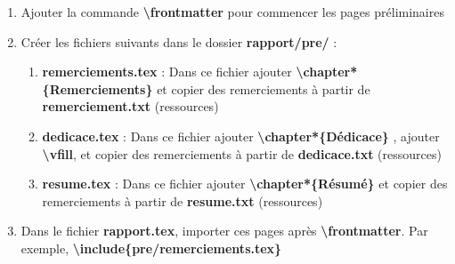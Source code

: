 \documentclass[11pt, a4paper]{article}
\begin{document}
\begin{enumerate}
\begin{multicols}{2}
\begin{itemize}
\begin{itemize}
				\item le titre doit être en gras, taille \textbf{Huge}, centré.
			\end{itemize}
			\item Ajouter \textbf{\textbackslash vspace\{2cm\}} pour pousser le contenu qui vient après avec 2cm
			\item Insérer un tableau sans bordures avec deux lignes et trois colonnes alignées à gauche :
			\begin{itemize}
				\item la première ligne "Encadré par :" en gras, vide,  "Réalisé par :" en gras 
				\item la deuxième ligne le nom de votre enseignant du TD, vide, les noms des étudiants
			\end{itemize}
		
			\item Après le tableau, ajouter \textbf{\textbackslash vfill} pour pousser le texte qui vient après vers le bas de page
			
			\item Ecrire "Année : " suivi de l'année, en gras, 14 pt, centré. 
		\end{itemize}
	\end{multicols}
	\item Ajouter la commande \textbf{\textbackslash frontmatter} pour commencer les pages préliminaires
	\item Créer les fichiers suivants dans le dossier \textbf{rapport/pre/} :  
	\begin{enumerate}
		\item \textbf{remerciements.tex} : Dans ce fichier ajouter \textbf{\textbackslash chapter*\{Remerciements\} } et copier des remerciements à partir de \textbf{remerciement.txt} (ressources)
		\item \textbf{dedicace.tex} : Dans ce fichier ajouter \textbf{\textbackslash chapter*\{Dédicace\} }, ajouter \textbf{\textbackslash vfill}, et copier des remerciements à partir de \textbf{dedicace.txt} (ressources)
		\item \textbf{resume.tex} : Dans ce fichier ajouter \textbf{\textbackslash chapter*\{Résumé\} }et copier des remerciements à partir de \textbf{resume.txt} (ressources) 
	\end{enumerate}
	\item Dans le fichier \textbf{rapport.tex}, importer ces pages après \textbf{\textbackslash frontmatter}. Par exemple, \textbf{\textbackslash include\{pre/remerciements.tex\}}
	

\end{enumerate}
\end{document}
